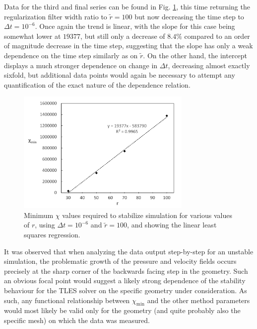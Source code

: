 Data for the third and final series can be found in Fig. \ref{fig:min_chi_dt6_r100}, this time returning the regularization filter width ratio to $\tilde{r}=100$ but now decreasing the time step to $\Delta t=10^{-6}$. Once again the trend is linear, with the slope for this case being somewhat lower at $19377$, but still only a decrease of $8.4\%$  compared to an order of magnitude decrease in the time step, suggesting that the slope has only a weak dependence on the time step similarly as on $\tilde{r}$. On the other hand, the intercept displays a much stronger dependence on change in $\Delta t$, decreasing almost exactly sixfold, but additional data points would again be necessary to attempt any quantification of the exact nature of the dependence relation.

\begin{figure}[!t]
\centering
\includegraphics[width=0.75\textwidth]{figures/min_chi_dt6_r100.pdf}
\caption{Minimum $\chi$ values required to stabilize simulation for various values of $r$, using $\Delta t=10^{-6}$ and $\tilde{r}=100$, and showing the linear least squares regression.}
\label{fig:min_chi_dt6_r100}
\end{figure}

It was observed that when analyzing the data output step-by-step for an unstable simulation, the problematic growth of the pressure and velocity fields occurs precisely at the sharp corner of the backwards facing step in the geometry. Such an obvious focal point would suggest a likely strong dependence of the stability behaviour for the TLES solver on the specific geometry under consideration. As such, any functional relationship between $\chi_{\mathrm{min}}$ and the other method parameters would most likely be valid only for the geometry (and quite probably also the specific mesh) on which the data was measured.

